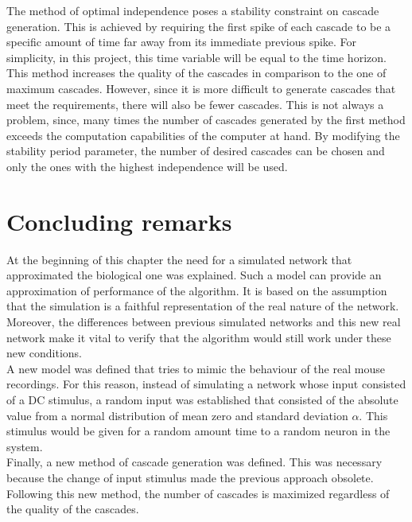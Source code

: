 The method of optimal independence poses a stability constraint on cascade generation. This is achieved by requiring the first spike of each cascade to be a specific amount of time far away from its immediate previous spike. For simplicity, in this project, this time variable will be equal to the time horizon.\\

This method increases the quality of the cascades in comparison to the one of maximum cascades. However, since it is more difficult to generate cascades that meet the requirements, there will also be fewer cascades. This is not always a problem, since, many times the number of cascades generated by the first method exceeds the computation capabilities of the computer at hand. By modifying the stability period parameter, the number of desired cascades can be chosen and only the ones with the highest independence will be used.

\section{Concluding remarks}

At the beginning of this chapter the need for a simulated network that approximated the biological one was explained. Such a model can provide an approximation of performance of the algorithm. It is based on the assumption that the simulation is a faithful representation of the real nature of the network. Moreover, the differences between previous simulated networks and this new real network make it vital to verify that the algorithm would still work under these new conditions. \\

A new model was defined that tries to mimic the behaviour of the real mouse recordings. For this reason, instead of simulating a network whose input consisted of a DC stimulus, a random input was established that consisted of the absolute value from a normal distribution of mean zero and standard deviation \(\alpha\). This stimulus would be given for a random amount time to a random neuron in the system. \\

Finally, a new method of cascade generation was defined. This was necessary because the change of input stimulus made the previous approach obsolete. Following this new method, the number of cascades is maximized regardless of the quality of the cascades.







